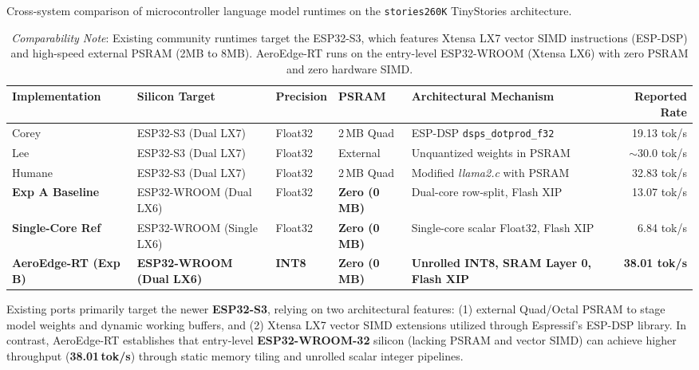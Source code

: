 \documentclass[10pt,a4paper]{article}
\begin{document}
\begin{table}[t]
\centering
\small
\caption{Cross-system comparison of microcontroller language model runtimes on the \texttt{stories260K} TinyStories architecture.}
\label{tab:related_work}
\begin{tabularx}{\textwidth}{l p{3.2cm} l l X r}
\toprule
\textbf{Implementation} & \textbf{Silicon Target} & \textbf{Precision} & \textbf{PSRAM} & \textbf{Architectural Mechanism} & \textbf{Reported Rate} \\
\midrule
Corey~\cite{corey2023esp32llm} & ESP32-S3 (Dual LX7) & Float32 & 2\,MB Quad & ESP-DSP \texttt{dsps\_dotprod\_f32} & 19.13 tok/s \\
Lee~\cite{dory2023esp32llm} & ESP32-S3 (Dual LX7) & Float32 & External & Unquantized weights in PSRAM & $\sim$30.0 tok/s \\
Humane~\cite{humane2023esp32llm} & ESP32-S3 (Dual LX7) & Float32 & 2\,MB Quad & Modified \textit{llama2.c} with PSRAM & 32.83 tok/s \\
\midrule
\textbf{Exp A Baseline} & ESP32-WROOM (Dual LX6) & Float32 & \textbf{Zero (0\,MB)} & Dual-core row-split, Flash XIP & 13.07 tok/s \\
\textbf{Single-Core Ref} & ESP32-WROOM (Single LX6)& Float32 & \textbf{Zero (0\,MB)} & Single-core scalar Float32, Flash XIP & 6.84 tok/s \\
\textbf{AeroEdge-RT (Exp B)}& \textbf{ESP32-WROOM (Dual LX6)}& \textbf{INT8} & \textbf{Zero (0\,MB)} & \textbf{Unrolled INT8, SRAM Layer 0, Flash XIP} & \textbf{38.01 tok/s} \\
\bottomrule
\end{tabularx}
\vspace{0.4em}
\caption*{\footnotesize\textit{Comparability Note}: Existing community runtimes target the ESP32-S3, which features Xtensa LX7 vector SIMD instructions (ESP-DSP) and high-speed external PSRAM (2MB to 8MB). AeroEdge-RT runs on the entry-level ESP32-WROOM (Xtensa LX6) with zero PSRAM and zero hardware SIMD.}
\end{table}

Existing ports primarily target the newer \textbf{ESP32-S3}, relying on two architectural features: (1) external Quad/Octal PSRAM to stage model weights and dynamic working buffers, and (2) Xtensa LX7 vector SIMD extensions utilized through Espressif's ESP-DSP library. In contrast, AeroEdge-RT establishes that entry-level \textbf{ESP32-WROOM-32} silicon (lacking PSRAM and vector SIMD) can achieve higher throughput (\textbf{38.01\,tok/s}) through static memory tiling and unrolled scalar integer pipelines.
\end{document}
